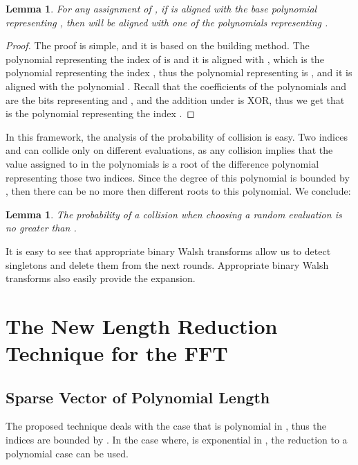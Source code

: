 \documentclass[11pt,amssymb]{article}
\newtheorem{lemma}[theorem]{Lemma}
\begin{document}
\begin{lemma}\label{l:WalAllignment}
For any assignment of , if  is aligned with the base
polynomial representing , then  will be aligned with
one of the polynomials representing .
\end{lemma}

\begin{proof}

The proof is simple, and it is based on the building method. The
polynomial representing the index of  is  and it is
aligned with , which is the polynomial representing the index
, thus the polynomial representing  is , and it is
aligned with the polynomial . Recall that the
coefficients of the polynomials  and  are the bits
representing  and , and the addition under  is XOR,
thus we get that  is the polynomial representing the
index . 

\end{proof}

In this framework, the analysis of the probability of collision is
easy. Two indices  and  can collide only on
 different evaluations, as any collision implies
that the value assigned to  in the polynomials is a root of the
difference polynomial representing those two indices. Since the degree
of this polynomial is bounded by , then there can be no more then
 different roots to this polynomial. We conclude: 

\begin{lemma}\label{l:prob_collision}
The probability of a collision when choosing a random evaluation 
is no greater than .
\end{lemma}

It is easy to see that appropriate binary Walsh transforms allow us to
detect singletons and delete them from the next rounds. Appropriate
binary Walsh transforms also easily provide the expansion.

\section{The New Length Reduction Technique for the FFT}\label{s:new_fft}

\subsection{Sparse Vector of Polynomial Length}\label{s:length}

The proposed technique deals with the case that  is polynomial
in , thus the indices are bounded by . In the case
where,  is exponential in , the reduction to a polynomial
case can be used.
\end{document}
